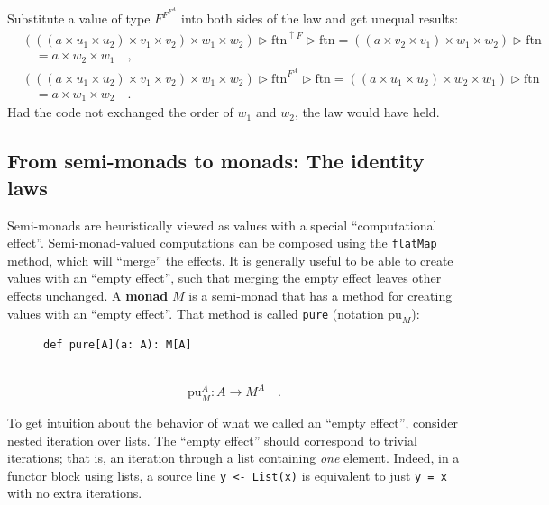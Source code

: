 Substitute a value of type $F^{F^{F^{A}}}$ into both sides of the
law and get unequal results:
\begin{align*}
 & \left(\left(\left(a\times u_{1}\times u_{2}\right)\times v_{1}\times v_{2}\right)\times w_{1}\times w_{2}\right)\triangleright\text{ftn}^{\uparrow F}\triangleright\text{ftn}=\left(\left(a\times v_{2}\times v_{1}\right)\times w_{1}\times w_{2}\right)\triangleright\text{ftn}\\
 & \quad=a\times w_{2}\times w_{1}\quad,\\
 & \left(\left(\left(a\times u_{1}\times u_{2}\right)\times v_{1}\times v_{2}\right)\times w_{1}\times w_{2}\right)\triangleright\text{ftn}^{F^{A}}\triangleright\text{ftn}=\left(\left(a\times u_{1}\times u_{2}\right)\times w_{2}\times w_{1}\right)\triangleright\text{ftn}\\
 & \quad=a\times w_{1}\times w_{2}\quad.
\end{align*}
Had the code not exchanged the order of $w_{1}$ and $w_{2}$, the
law would have held.

\subsection{From semi-monads to monads: The identity laws}

Semi-monads are heuristically viewed as values with a special \textsf{``}computational
effect\textsf{''}. Semi-monad-valued computations can be composed using the
\lstinline!flatMap! method, which will \textsf{``}merge\textsf{''} the effects. It
is generally useful to be able to create values with an \textsf{``}empty effect\textsf{''},
such that merging the empty effect leaves other effects unchanged.
A \textbf{monad} $M$ is a semi-monad that has a method for creating
values with an \textsf{``}empty effect\textsf{''}. That method is called \lstinline!pure!
(notation $\text{pu}_{M}$):

\begin{figure}%
\vspace{-0.4\baselineskip}
\begin{lstlisting}
def pure[A](a: A): M[A]
\end{lstlisting}
\vspace{-0.6\baselineskip}
\end{figure}%

~\vspace{-0.4\baselineskip}
\[
\text{pu}_{M}^{A}:A\rightarrow M^{A}\quad.
\]

To get intuition about the behavior of what we called an \textsf{``}empty
effect\textsf{''}, consider nested iteration over lists. The \textsf{``}empty effect\textsf{''}
should correspond to trivial iterations; that is, an iteration through
a list containing \emph{one} element.  Indeed, in a functor block
using lists, a source line \lstinline!y <- List(x)! is equivalent
to just \lstinline!y = x! with no extra iterations.

